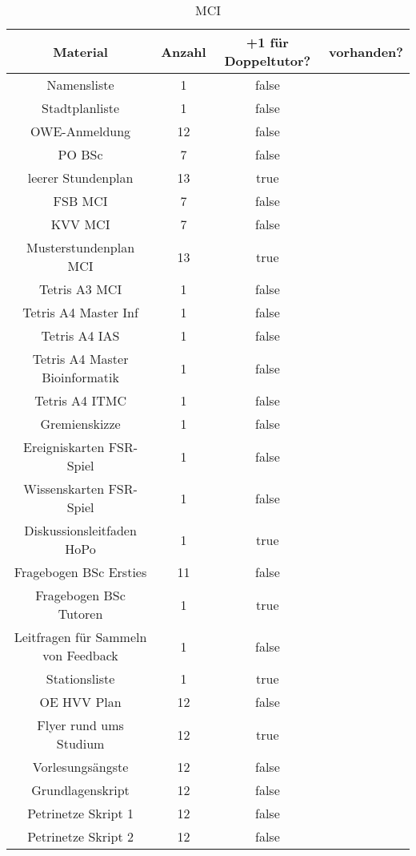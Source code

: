 \documentclass[10pt,a4paper,oneside,ngerman,numbers=noenddot]{scrartcl}
\begin{document}
\begin{table}[ht]
	\caption{MCI}
	\begin{tabular}{c|c|c|c}
		\textbf{Material} & \textbf{Anzahl} & \textbf{+1 für Doppeltutor?} & \textbf{vorhanden?} \\
		\hline
		Namensliste & 1 & false & \\
		\hline
		Stadtplanliste & 1 & false & \\
		\hline
		OWE-Anmeldung & 12 & false & \\
		\hline
		PO BSc & 7 & false & \\
		\hline
		leerer Stundenplan & 13 & true & \\
		\hline
		FSB MCI & 7 & false & \\
		\hline
		KVV MCI & 7 & false & \\
		\hline
		Musterstundenplan MCI & 13 & true & \\
		\hline
		Tetris A3 MCI & 1 & false & \\
		\hline
		Tetris A4 Master Inf & 1 & false & \\
		\hline
		Tetris A4 IAS & 1 & false & \\
		\hline
		Tetris A4 Master Bioinformatik & 1 & false & \\
		\hline
		Tetris A4 ITMC & 1 & false & \\
		\hline
		Gremienskizze & 1 & false & \\
		\hline
		Ereigniskarten FSR-Spiel & 1 & false & \\
		\hline
		Wissenskarten FSR-Spiel & 1 & false & \\
		\hline
		Diskussionsleitfaden HoPo & 1 & true & \\
		\hline
		Fragebogen BSc Ersties & 11 & false & \\
		\hline
		Fragebogen BSc Tutoren & 1 & true & \\
		\hline
		Leitfragen für Sammeln von Feedback & 1 & false & \\
		\hline
		Stationsliste & 1 & true & \\
		\hline
		OE HVV Plan & 12 & false & \\
		\hline
		Flyer rund ums Studium & 12 & true & \\
		\hline
		Vorlesungsängste & 12 & false & \\
		\hline
		Grundlagenskript & 12 & false & \\
		\hline
		Petrinetze Skript 1 & 12 & false & \\
		\hline
		Petrinetze Skript 2 & 12 & false & \\

\end{tabular}
\end{table}
\end{document}
